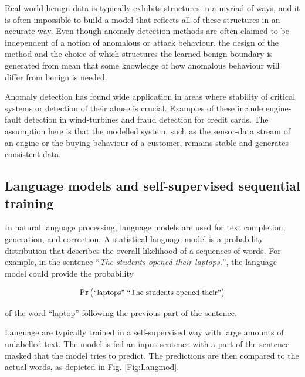 Real-world benign data is typically exhibits structures in a myriad of ways, and it is often impossible to build a model that reflects all of these structures in an accurate way. Even though anomaly-detection methods are often claimed to be independent of a notion of anomalous or attack behaviour, the design of the method and the choice of which structures the learned benign-boundary is generated from mean that some knowledge of how anomalous behaviour will differ from benign is needed.

Anomaly detection has found wide application in areas where stability of  critical systems or detection of their abuse is crucial. Examples of these include engine-fault detection in wind-turbines and fraud detection for credit cards. The assumption here is that the modelled system, such as the sensor-data stream of an engine or the buying behaviour of a customer, remains stable and generates consistent data.



\subsection{Language models and self-supervised sequential training}

In natural language processing, language models are used for text completion, generation, and correction. A statistical language model is a probability distribution that describes the overall likelihood of a sequences of words. For example, in the sentence ``\textit{The students opened their laptops.}'', the language model could provide the probability 

\begin{align*}
\Pr\big(\text{\small``laptops''}|\text{\small``The students opened their''}\big)
\end{align*}

of the word ``laptop'' following the previous part of the sentence.


Language are typically trained in a self-supervised way with large amounts of unlabelled text. The model is fed an input sentence with a part of the sentence masked that the model tries to predict. The predictions are then compared to the actual words, as depicted in Fig. \ref{Fig:Langmod}.

